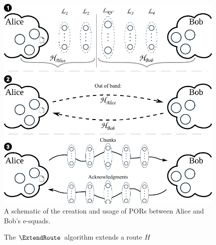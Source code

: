 \begin{figure}[t]
\center
  \includegraphics[scale=.55]{figures/file_exchange_v2.pdf}
  \caption{\label{fig:file-exchange}A schematic of the creation and usage of PORs between Alice and Bob's e-squads.}
\end{figure}



\begin{figure}
  \caption{\label{ExtendRoute}%
    \scriptsize
    The \(\ExtendRoute\) algorithm extends a route \(H\)
  }
\end{figure}


